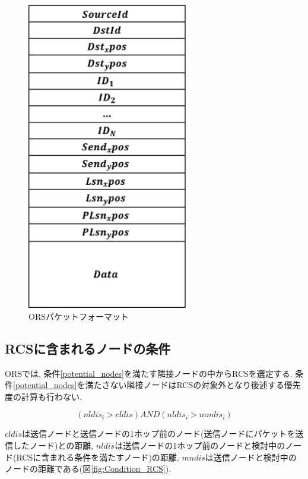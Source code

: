\documentclass[10pt]{jreport}
\begin{document}
\begin{figure}[!ht]
	\centering
	\includegraphics[width=70mm]{figures/ORS_packet.eps}
	\caption{ORSパケットフォーマット}
	\label{fig:ORS_packet}
\end{figure}


\subsection{RCSに含まれるノードの条件}
ORSでは, 条件\ref{potential_nodes}を満たす隣接ノードの中からRCSを選定する. 条件\ref{potential_nodes}を満たさない隣接ノードはRCSの対象外となり後述する優先度の計算も行わない.

\begin{equation}
	\label{potential_nodes}
	\left( nldis_i > cldis \right)   AND   \left( nldis_i > mndis_i \right) 
\end{equation}

$cldis$は送信ノードと送信ノードの1ホップ前のノード(送信ノードにパケットを送信したノード)との距離, $nldis$は送信ノードの1ホップ前のノードと検討中のノード(RCSに含まれる条件を満たすノード)の距離, $mndis$は送信ノードと検討中のノードの距離である(図\ref{fig:Condition_RCS}). 
\end{document}
